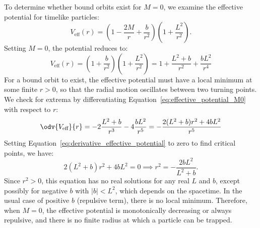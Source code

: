 \begin{solution}[(v)]
  To determine whether bound orbits exist for $M = 0$, we examine the effective potential for timelike particles:
  \[%
    V_{\text{eff}}(r) = \left(1 - \frac{2M}{r} + \frac{b}{r^2}\right) \left(1 + \frac{L^2}{r^2}\right)
  .\]%
  Setting $M = 0$, the potential reduces to:
  \begin{equation}\label{eq:effective_potential_M0}
    V_{\text{eff}}(r) = \left(1 + \frac{b}{r^2}\right) \left(1 + \frac{L^2}{r^2}\right) = 1 + \frac{L^2 + b}{r^2} + \frac{bL^2}{r^4}
  \end{equation}
  For a bound orbit to exist, the effective potential must have a local minimum at some finite $r > 0$, so that the radial motion oscillates between two turning points. We check for extrema by differentiating Equation~\eqref{eq:effective_potential_M0} with respect to $r$:
  \begin{equation}\label{eq:derivative_effective_potential}
    \odv{V_{\text{eff}}}{r} = -2\frac{L^2 + b}{r^3} - 4 \frac{bL^2}{r^5} = -\frac{2(L^2 + b) r^2 + 4 bL^2}{r^5}
  \end{equation}
  Setting Equation~\eqref{eq:derivative_effective_potential} to zero to find critical points, we have:
  \[%
    2(L^2 + b) r^2 + 4 bL^2 = 0 \implies r^2 = -\frac{2bL^2}{L^2 + b}
  .\]%
  Since $r^2 > 0$, this equation has no real solutions for any real $L$ and $b$, except possibly for negative $b$ with $|b| < L^2$, which depends on the spacetime. In the usual case of positive $b$ (repulsive term), there is no local minimum. Therefore, when $M = 0$, the effective potential is monotonically decreasing or always repulsive, and there is no finite radius at which a particle can be trapped.
\end{solution}

